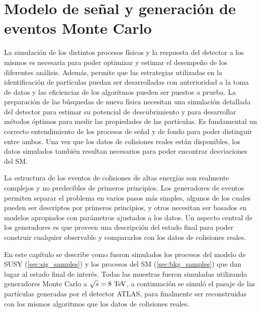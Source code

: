 \chapter{Modelo de señal y generación de eventos Monte Carlo}
\label{cap:simulaciones}

La simulación de los distintos procesos físicos y la respuesta del detector a
los mismos es necesaria para poder optimizar y estimar el desempeño de los
diferentes análisis. Además, permite que las estrategias utilizadas en la
identificación de partículas puedan ser desarrolladas con anterioridad a la toma
de datos y las
eficiencias de los algoritmos pueden ser puestos a prueba. La preparación de las
búsquedas de nueva física necesitan una simulación detallada del detector para
estimar su potencial de descubrimiento y para desarrollar métodos óptimos para medir las
propiedades de las partículas. Es fundamental un correcto entendimiento de los
procesos de señal y de fondo para poder distinguir entre ambos. Una vez que los
datos de colisiones reales están disponibles, los datos simulados también
resultan necesarios para poder encontrar desviaciones del SM.

La estructura de los eventos de colisiones de altas energías son realmente
complejos y no predecibles de primeros principios. Los generadores de eventos
permiten separar el problema en varios pasos más simples, algunos de los cuales
pueden ser descriptos por primeros principios, y otros necesitan ser basados en
modelos apropiados con parámetros ajustados a los datos. Un aspecto central de
los generadores es que proveen una descripción del estado final para
poder construir cualquier observable y compararlos con los datos de colisiones
reales.

En este capítulo se describe como fueron simulados los procesos del modelo de
SUSY (\cref{sec:sig_samples}) y los procesos del SM (\cref{sec:bkg_samples}) que
dan lugar al estado final de interés. Todas las muestras fueron simuladas
utilizando generadores Monte Carlo a $\sqrt{s}=8\tev$, a continuación se simuló
el pasaje de las partículas generadas por el detector ATLAS, para finalmente ser
reconstruidas con los mismos algoritmos que los datos de colisiones reales.





